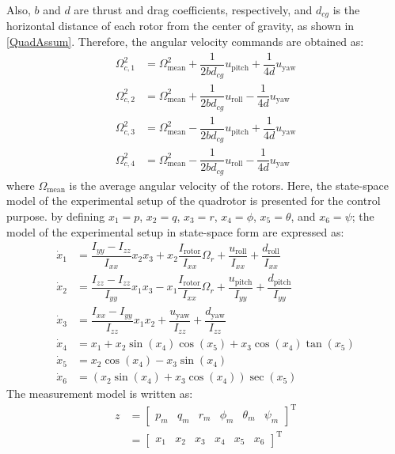 \documentclass[conference]{IEEEtran}
\begin{document}
Also, $b$ and $d$ are thrust and drag coefficients, respectively, and $d_{cg}$ is the horizontal distance of each rotor from the center of gravity, as shown in \figurename{\ref{QuadAssum}}. Therefore, the angular velocity commands are obtained as:
\begin{equation}
	\begin{split}
		\Omega_{c, 1}^2 &= \Omega_{\text{mean}}^2 + \dfrac{1}{2bd_{cg}}u_{\text{pitch}} + \dfrac{1}{4d}u_{\text{yaw}} \\
		\Omega_{c, 2}^2 &= \Omega_{\text{mean}}^2 + \dfrac{1}{2bd_{cg}}u_{\text{roll}} - \dfrac{1}{4d}u_{\text{yaw}} \\
		\Omega_{c, 3}^2 &= \Omega_{\text{mean}}^2 - \dfrac{1}{2bd_{cg}}u_{\text{pitch}} + \dfrac{1}{4d}u_{\text{yaw}} \\
		\Omega_{c, 4}^2 &= \Omega_{\text{mean}}^2 - \dfrac{1}{2bd_{cg}}u_{\text{roll}} - \dfrac{1}{4d}u_{\text{yaw}}
	\end{split}
\end{equation}
where $\Omega_{\text{mean}}$ is the average angular velocity of the rotors.
Here, the state-space model of the experimental setup of the quadrotor is presented for the control purpose. by defining $x_1 = p$, $x_2 = q$, $x_3 = r$, $x_4 = \phi$, $x_5 = \theta$, and $x_6 = \psi$; the model of the experimental setup in state-space form are expressed as:
\begin{equation}
	\begin{split}
		\dot x_1 &= \dfrac{I_{yy} - I_{zz}}{I_{xx}} x_2 x_3 + x_2 \dfrac{I_{\text{rotor}}}{I_{xx}}\Omega_r + \dfrac{u_{\text{roll}}}{I_{xx}} + \dfrac{d_{\text{roll}}}{I_{xx}} \\
		\dot x_2 &= \dfrac{I_{zz} - I_{zz}}{I_{yy}} x_1 x_3 - x_1 \dfrac{I_{\text{rotor}}}{I_{xx}}\Omega_r + \dfrac{u_{\text{pitch}}}{I_{yy}} + \dfrac{d_{\text{pitch}}}{I_{yy}} \\
		\dot x_3 &= \dfrac{I_{xx} - I_{yy}}{I_{zz}} x_1 x_2 + \dfrac{u_{\text{yaw}}}{I_{zz}} + \dfrac{d_{\text{yaw}}}{I_{zz}} \\
		\dot x_4 &= x_1 + x_2\sin(x_4)\cos(x_5) + x_3\cos(x_4)\tan(x_5)\\
		\dot x_5 &= x_2\cos(x_4) - x_3\sin(x_4)\\
		\dot x_6 &= (x_2\sin(x_4) + x_3\cos(x_4))\sec(x_5)
	\end{split}
\end{equation}
The measurement model is written as:
\begin{equation}
	\begin{split}
		z &= \begin{bmatrix}
			p_m & q_m & r_m & \phi_m & \theta_m & \psi_m
		\end{bmatrix}^\mathrm{T}
		\\
		& = \begin{bmatrix}
			x_1 & x_2 & x_3 & x_4 & x_5 & x_6
		\end{bmatrix}^\mathrm{T}
	\end{split}
\end{equation}
\end{document}
